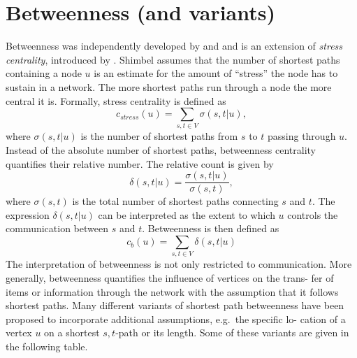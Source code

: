 \documentclass[]{book}
\theoremstyle{definition}
\theoremstyle{definition}
\theoremstyle{definition}
\theoremstyle{remark}
\begin{document}
\hypertarget{betweenness-and-variants}{%
\section{Betweenness (and variants)}\label{betweenness-and-variants}}

Betweenness was independently developed by \citet{a-rdg-71} and
\citet{f-smcbb-77} and is an extension of \emph{stress centrality},
introduced by \citet{s-spcn-53}. Shimbel assumes that the number of
shortest paths containing a node \(u\) is an estimate for the amount of
``stress'' the node has to sustain in a network. The more shortest paths
run through a node the more central it is. Formally, stress centrality
is defined as \[
c_{stress}(u)=\sum\limits_{s,t \in V} \sigma(s,t\lvert u),
\] where \(\sigma(s,t\lvert u)\) is the number of shortest paths from
\(s\) to \(t\) passing through \(u\). Instead of the absolute number of
shortest paths, betweenness centrality quantifies their relative number.
The relative count is given by \[
\delta(s,t\lvert u)= \frac{\sigma(s,t\lvert u)}{\sigma(s,t)},
\] where \(\sigma(s,t)\) is the total number of shortest paths
connecting \(s\) and \(t\). The expression \(\delta(s,t\lvert u)\) can
be interpreted as the extent to which \(u\) controls the communication
between \(s\) and \(t\). Betweenness is then defined as \[
c_b(u) = \sum\limits_{s,t \in V} \delta(s,t\lvert u)
\] The interpretation of betweenness is not only restricted to
communication. More generally, betweenness quantifies the influence of
vertices on the trans- fer of items or information through the network
with the assumption that it follows shortest paths. Many different
variants of shortest path betweenness have been proposed to incorporate
additional assumptions, e.g.~the specific lo- cation of a vertex \(u\)
on a shortest \(s,t\)-path or its length. Some of these variants are
given in the following table.
\end{document}
